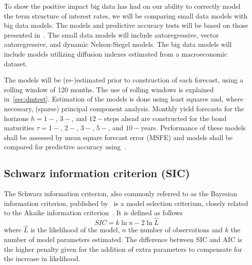 To show the positive impact big data has had on our ability to correctly model the term structure of interest rates, we will be comparing small data models with big data models. The models and predictive accuracy tests will be based on those presented in~\textcite{Swanson2017}. The small data models will include autoregressive, vector autoregressive, and dynamic Nelson-Siegel models. The big data models will include models utilizing diffusion indexes estimated from a macroeconomic dataset. 

The models will be (re-)estimated prior to construction of each forecast, using a rolling window of 120 months. The use of rolling windows is explained in~\cref{sec:dmtest}. Estimation of the models is done using least squares and, where necessary, (sparse) principal component analysis. Monthly yield forecasts for the horizons $h = 1-$, $3-$, and $12-$steps ahead are constructed for the bond maturities $\tau = 1-$, $2-$, $3-$, $5-$, and $10-$years. Performance of these models shall be assessed by mean square forecast error (MSFE) and models shall be compared for predictive accuracy using~\textcite[hereafter DM]{Diebold1994}. 

\subsection{Schwarz information criterion (SIC)}
\label{sec:sic}
The Schwarz information criterion, also commonly referred to as the Bayesian information criterion, published by~\textcite[hereafter SIC]{Schwarz1978} is a model selection criterium, closely related to the Akaike information criterion~\parencite{Akaike1974}. It is defined as follows
\begin{equation}
	SIC = k\ln{n} - 2\ln{\hat{L}}
\end{equation}
where $\hat{L}$ is the likelihood of the model, $n$ the number of observations and $k$ the number of model parameters estimated. The difference between SIC and AIC is the higher penalty given for the addition of extra parameters to compensate for the increase in likelihood.


